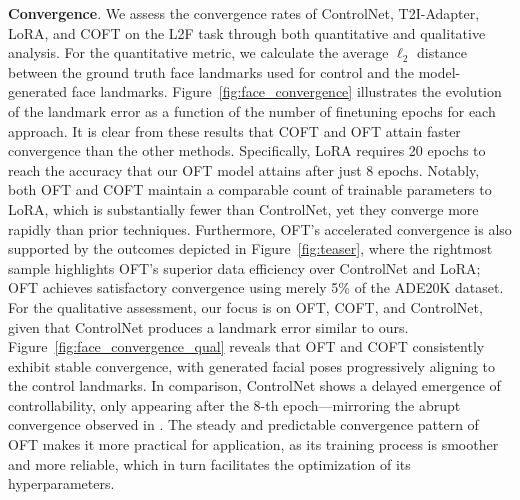 \textbf{Convergence}. We assess the convergence rates of ControlNet, T2I-Adapter, LoRA, and COFT on the L2F task through both quantitative and qualitative analysis. For the quantitative metric, we calculate the average $\ell_2$ distance between the ground truth face landmarks used for control and the model-generated face landmarks. Figure~\ref{fig:face_convergence} illustrates the evolution of the landmark error as a function of the number of finetuning epochs for each approach. It is clear from these results that COFT and OFT attain faster convergence than the other methods. Specifically, LoRA requires 20 epochs to reach the accuracy that our OFT model attains after just 8 epochs. Notably, both OFT and COFT maintain a comparable count of trainable parameters to LoRA, which is substantially fewer than ControlNet, yet they converge more rapidly than prior techniques. Furthermore, OFT's accelerated convergence is also supported by the outcomes depicted in Figure~\ref{fig:teaser}, where the rightmost sample highlights OFT's superior data efficiency over ControlNet and LoRA; OFT achieves satisfactory convergence using merely 5\% of the ADE20K dataset. For the qualitative assessment, our focus is on OFT, COFT, and ControlNet, given that ControlNet produces a landmark error similar to ours. Figure~\ref{fig:face_convergence_qual} reveals that OFT and COFT consistently exhibit stable convergence, with generated facial poses progressively aligning to the control landmarks. In comparison, ControlNet shows a delayed emergence of controllability, only appearing after the 8-th epoch—mirroring the abrupt convergence observed in \cite{zhang2023adding}. The steady and predictable convergence pattern of OFT makes it more practical for application, as its training process is smoother and more reliable, which in turn facilitates the optimization of its hyperparameters.

